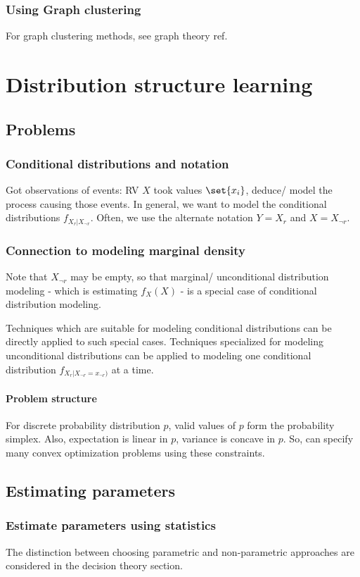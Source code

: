 \documentclass[oneside, article]{memoir}
\begin{document}
\section{Using Graph clustering}
For graph clustering methods, see graph theory ref.

\part{Distribution structure learning}
\chapter{Problems}
\section{Conditional distributions and notation}
Got observations of events: RV $X$ took values $\set{x_{i}}$, deduce/ model the process causing those events. In general, we want to model the conditional distributions $f_{X_r|X_{\lnot r}}$. Often, we use the alternate notation $Y = X_r$ and $X = X_{\lnot r}$.

\section{Connection to modeling marginal density}
Note that $X_{\lnot r}$ may be empty, so that marginal/ unconditional distribution modeling - which is estimating $f_X(X)$ - is a special case of conditional distribution modeling.

Techniques which are suitable for modeling conditional distributions can be directly applied to such special cases. Techniques specialized for modeling unconditional distributions can be applied to modeling one conditional distribution $f_{X_r|X_{\lnot r} = x_{\lnot r})}$ at a time.

\subsection{Problem structure}
For discrete probability distribution $p$, valid values of $p$ form the probability simplex. Also, expectation is linear in $p$, variance is concave in $p$.  So, can specify many convex optimization problems using these constraints.

\chapter{Estimating parameters}
\section{Estimate parameters using statistics}
The distinction between choosing parametric and non-parametric approaches are considered in the decision theory section.
\end{document}

